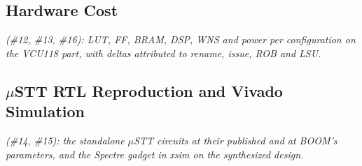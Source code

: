 
\subsection{Hardware Cost}
\label{sec:results_hardware}

\textit{(\#12, \#13, \#16): LUT, FF, BRAM, DSP, WNS and power per configuration on the VCU118 part, with deltas attributed to rename, issue, ROB and LSU.}

\subsection{$\mu$STT RTL Reproduction and Vivado Simulation}
\label{sec:results_ustt_rtl}

\textit{(\#14, \#15): the standalone $\mu$STT circuits at their published and at BOOM's parameters, and the Spectre gadget in xsim on the synthesized design.}
